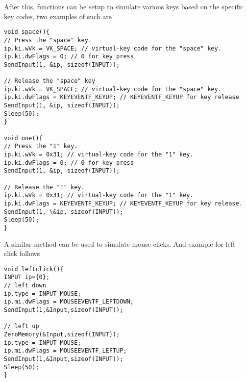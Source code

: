After this, functions can be setup to simulate various keys based on the specific key codes, two examples of such are
\begin{lstlisting}
void space(){ 
// Press the "space" key.  
ip.ki.wVk = VK_SPACE; // virtual-key code for the "space" key.                                                                                
ip.ki.dwFlags = 0; // 0 for key press                                                                                                        
SendInput(1, &ip, sizeof(INPUT));

// Release the "space" key                                                                                                                   
ip.ki.wVk = VK_SPACE; // virtual-key code for the "space" key.                                                                                
ip.ki.dwFlags = KEYEVENTF_KEYUP; // KEYEVENTF_KEYUP for key release                                                                          
SendInput(1, &ip, sizeof(INPUT));
Sleep(50);
}

void one(){ 
// Press the "1" key.    
ip.ki.wVk = 0x31; // virtual-key code for the "1" key.                                          
ip.ki.dwFlags = 0; // 0 for key press                                                                                                        
SendInput(1, &ip, sizeof(INPUT));

// Release the "1" key.                                                                                                                    
ip.ki.wVk = 0x31; // virtual-key code for the "1" key.                                                                                      
ip.ki.dwFlags = KEYEVENTF_KEYUP; // KEYEVENTF_KEYUP for key release.                                                                          
SendInput(1, \&ip, sizeof(INPUT));
Sleep(50);
}
\end{lstlisting}

A similar method can be used to simulate mouse clicks. And example for left click follows
\begin{lstlisting}
void leftclick(){
INPUT ip={0};
// left down                                                                                                                                   
ip.type = INPUT_MOUSE;
ip.mi.dwFlags = MOUSEEVENTF_LEFTDOWN;
SendInput(1,&Input,sizeof(INPUT));

// left up                                                                                                                                     
ZeroMemory(&Input,sizeof(INPUT));
ip.type = INPUT_MOUSE;
ip.mi.dwFlags = MOUSEEVENTF_LEFTUP;
SendInput(1,&Input,sizeof(INPUT));
Sleep(50);
}
\end{lstlisting}





